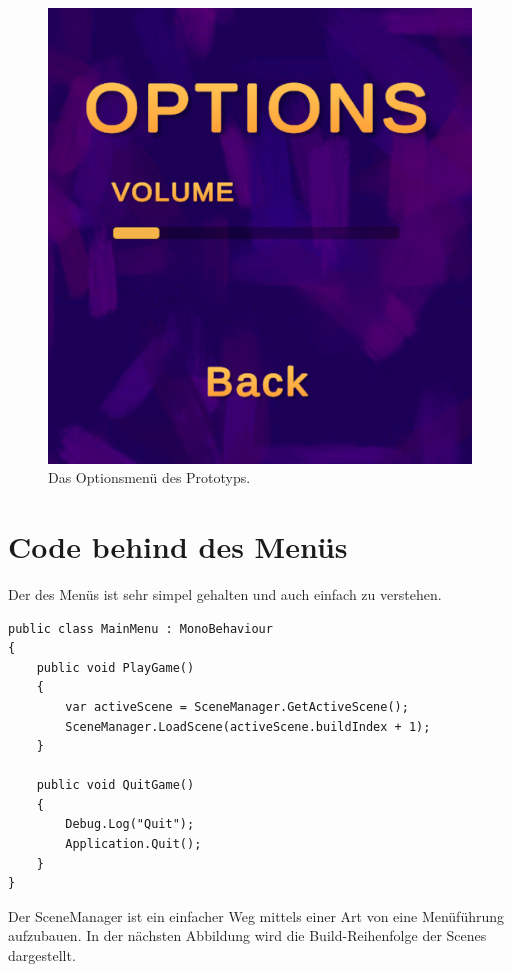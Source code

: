 \begin{figure}[H]
\begin{minipage}{0.4\textwidth}
        \includegraphics[width=\linewidth]{chapters/03/images/OptionsMainMenu.png}
        \caption{Das Optionsmenü des Prototyps.}
        \label{htl02b}
    \end{minipage}
\end{figure}

\section{Code behind des Menüs}

Der  des Menüs ist sehr simpel gehalten und auch einfach zu verstehen.

\begin{lstlisting}[language=CSharp,caption={Main Menu Klasse.},label=code:mainmenu]
public class MainMenu : MonoBehaviour
{
    public void PlayGame()
    {
        var activeScene = SceneManager.GetActiveScene();
        SceneManager.LoadScene(activeScene.buildIndex + 1);
    }

    public void QuitGame()
    {
        Debug.Log("Quit");
        Application.Quit();
    }
}
\end{lstlisting}
Der SceneManager ist ein einfacher Weg mittels einer Art von  eine Menüführung aufzubauen. In der nächsten Abbildung wird die Build-Reihenfolge der Scenes dargestellt.

